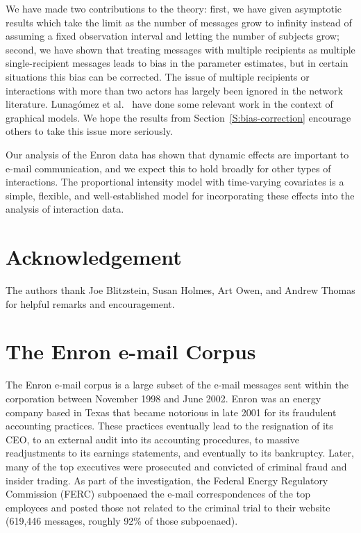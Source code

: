 \documentclass[aoas,preprint]{imsart}
\begin{document}
We have made two contributions to the theory:
first, we have given asymptotic results which take the limit as the number
of messages grow to infinity instead of assuming a fixed observation interval
and letting the number of subjects grow; second, we have shown that treating
messages with multiple recipients as multiple single-recipient messages leads
to bias in the parameter estimates, but in certain situations this bias can
be corrected. The issue of multiple recipients or interactions with more than
two actors has largely been ignored in the network literature.
Lunag\'omez et al.~\cite{lunagomez2009geometric} have done some relevant
work in the context of graphical models.  We hope the results from
Section~\ref{S:bias-correction} encourage others to take this issue more
seriously.

Our analysis of the Enron data has shown that dynamic effects are important
to e-mail communication, and we expect this to hold broadly for other
types of interactions.  The proportional intensity model with time-varying
covariates is a simple, flexible, and well-established model for incorporating
these effects into the analysis of interaction data.


\section*{Acknowledgement}

The authors thank Joe Blitzstein, Susan Holmes, Art Owen, and Andrew Thomas
for helpful remarks and encouragement.


\appendix

\section{The Enron e-mail Corpus}\label{S:enron-corpus}

The Enron e-mail corpus is a large subset of the e-mail messages sent within the
corporation between November 1998 and June 2002. Enron was an energy company
based in Texas that became notorious in late 2001 for its fraudulent
accounting practices. These practices eventually lead to the resignation of
its CEO, to an external audit into its accounting procedures, to massive
readjustments to its earnings statements, and eventually to its bankruptcy.
Later, many of the top executives were prosecuted and convicted of criminal
fraud and insider trading. As part of the investigation, the Federal Energy
Regulatory Commission (FERC) subpoenaed the e-mail correspondences of the top
employees and posted those not related to the criminal trial to their website
(619,446 messages, roughly 92\% of those subpoenaed).
\end{document}
